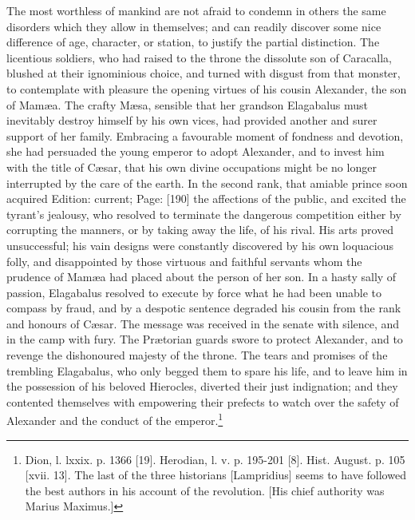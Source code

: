 The most worthless of mankind are not afraid to condemn in others the same disorders which they allow in themselves; and can readily discover some nice difference of age, character, or station, to justify the partial distinction. The licentious soldiers, who had raised to the throne the dissolute son of Caracalla, blushed at their ignominious choice, and turned with disgust from that monster, to contemplate with pleasure the opening virtues of his cousin Alexander, the son of Mamæa. The crafty Mæsa, sensible that her grandson Elagabalus must inevitably destroy himself by his own vices, had provided another and surer support of her family. Embracing a favourable moment of fondness and devotion, she had persuaded the young emperor to adopt Alexander, and to invest him with the title of Cæsar, that his own divine occupations might be no longer interrupted by the care of the earth. In the second rank, that amiable prince soon acquired Edition: current; Page: [190] the affections of the public, and excited the tyrant\texthebrew{}’s jealousy, who resolved to terminate the dangerous competition either by corrupting the manners, or by taking away the life, of his rival. His arts proved unsuccessful; his vain designs were constantly discovered by his own loquacious folly, and disappointed by those virtuous and faithful servants whom the prudence of Mamæa had placed about the person of her son. In a hasty sally of passion, Elagabalus resolved to execute by force what he had been unable to compass by fraud, and by a despotic sentence degraded his cousin from the rank and honours of Cæsar. The message was received in the senate with silence, and in the camp with fury. The Prætorian guards swore to protect Alexander, and to revenge the dishonoured majesty of the throne. The tears and promises of the trembling Elagabalus, who only begged them to spare his life, and to leave him in the possession of his beloved Hierocles, diverted their just indignation; and they contented themselves with empowering their prefects to watch over the safety of Alexander and the conduct of the emperor.\footnote{Dion, l. lxxix. p. 1366 [19]. Herodian, l. v. p. 195-201 [8]. Hist. August. p. 105 [xvii. 13]. The last of the three historians [Lampridius] seems to have followed the best authors in his account of the revolution. [His chief authority was Marius Maximus.]}

